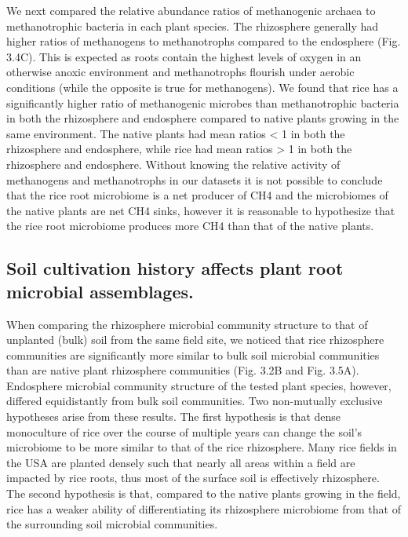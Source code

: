 We next compared the relative abundance ratios of methanogenic archaea to methanotrophic bacteria in each plant species. The rhizosphere generally had higher ratios of methanogens to methanotrophs compared to the endosphere (Fig. 3.4C). This is expected as roots contain the highest levels of oxygen in an otherwise anoxic environment and methanotrophs flourish under aerobic conditions (while the opposite is true for methanogens). We found that rice has a significantly higher ratio of methanogenic microbes than methanotrophic bacteria in both the rhizosphere and endosphere compared to native plants growing in the same environment. The native plants had mean ratios < 1 in both the rhizosphere and endosphere, while rice had mean ratios > 1 in both the rhizosphere and endosphere. Without knowing the relative activity of methanogens and methanotrophs in our datasets it is not possible to conclude that the rice root microbiome is a net producer of CH4 and the microbiomes of the native plants are net CH4 sinks, however it is reasonable to hypothesize that the rice root microbiome produces more CH4 than that of the native plants. 

\subsection{Soil cultivation history affects plant root microbial assemblages.}
When comparing the rhizosphere microbial community structure to that of unplanted (bulk) soil from the same field site, we noticed that rice rhizosphere communities are significantly more similar to bulk soil microbial communities than are native plant rhizosphere communities (Fig. 3.2B and Fig. 3.5A). Endosphere microbial community structure of the tested plant species, however, differed equidistantly from bulk soil communities. Two non-mutually exclusive hypotheses arise from these results. The first hypothesis is that dense monoculture of rice over the course of multiple years can change the soil's microbiome to be more similar to that of the rice rhizosphere. Many rice fields in the USA are planted densely such that nearly all areas within a field are impacted by rice roots, thus most of the surface soil is effectively rhizosphere. The second hypothesis is that, compared to the native plants growing in the field, rice has a weaker ability of differentiating its rhizosphere microbiome from that of the surrounding soil microbial communities. 

